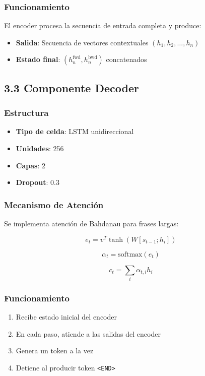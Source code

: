 \documentclass[12pt,a4paper]{article}
\begin{document}
\subsubsection{Funcionamiento}
El encoder procesa la secuencia de entrada completa y produce:
\begin{itemize}
    \item \textbf{Salida}: Secuencia de vectores contextuales $(h_1, h_2, \ldots, h_n)$
    \item \textbf{Estado final}: $(h_n^{\text{fwd}}, h_n^{\text{bwd}})$ concatenados
\end{itemize}

\subsection{3.3 Componente Decoder}

\subsubsection{Estructura}
\begin{itemize}
    \item \textbf{Tipo de celda}: LSTM unidireccional
    \item \textbf{Unidades}: 256
    \item \textbf{Capas}: 2
    \item \textbf{Dropout}: 0.3
\end{itemize}

\subsubsection{Mecanismo de Atención}
Se implementa atención de Bahdanau para frases largas:

\begin{equation}
e_t = v^T \tanh(W[s_{t-1}; h_i])
\end{equation}

\begin{equation}
\alpha_t = \text{softmax}(e_t)
\end{equation}

\begin{equation}
c_t = \sum_i \alpha_{t,i} h_i
\end{equation}

\subsubsection{Funcionamiento}
\begin{enumerate}
    \item Recibe estado inicial del encoder
    \item En cada paso, atiende a las salidas del encoder
    \item Genera un token a la vez
    \item Detiene al producir token \texttt{<END>}
\end{enumerate}
\end{document}
